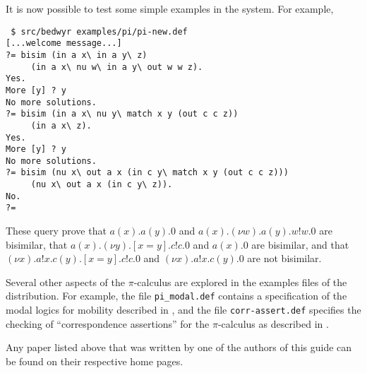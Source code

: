 \documentclass{article}
\begin{document}
It is now possible to test some simple examples in the system.  For
example,
\begin{verbatim}
 $ src/bedwyr examples/pi/pi-new.def
[...welcome message...]
?= bisim (in a x\ in a y\ z)
     (in a x\ nu w\ in a y\ out w w z).
Yes.
More [y] ? y
No more solutions.
?= bisim (in a x\ nu y\ match x y (out c c z))
     (in a x\ z).
Yes.
More [y] ? y
No more solutions.
?= bisim (nu x\ out a x (in c y\ match x y (out c c z)))
     (nu x\ out a x (in c y\ z)).
No.
?=
\end{verbatim}
These query prove that
$a(x).a(y).0$ and $a(x).(\nu w).a(y).w!w.0$ are bisimilar,
that
$a(x).(\nu y).[x=y].c!c.0$ and $a(x).0$ are bisimilar, and that
$(\nu x).a!x.c(y).[x=y].c!c.0$ and
$(\nu x).a!x.c(y).0$ are not bisimilar.

Several other aspects of the $\pi$-calculus are explored in the examples
files of the distribution.  For example, the file \verb+pi_modal.def+
contains a specification of the modal logics for mobility described in
\cite{milner93tcs}, and the file \verb+corr-assert.def+ specifies the
checking of ``correspondence assertions'' for the $\pi$-calculus as
described in \cite{gordon03tcs}.



\noindent Any paper listed above that was written by one of the
authors of this guide can be found on their respective home pages.
\end{document}
